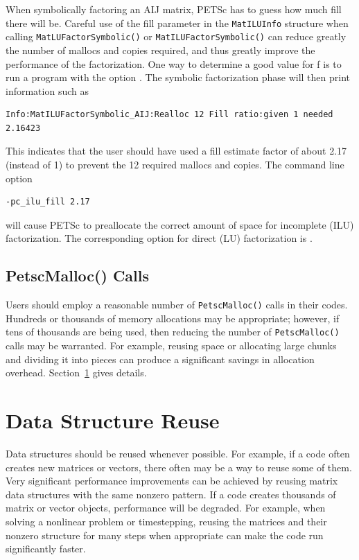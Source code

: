 {{When symbolically factoring an AIJ matrix, PETSc has to guess
how much fill there will be.  Careful use of the fill parameter in the
\lstinline{MatILUInfo} structure
when calling \lstinline{MatLUFactorSymbolic()} or \lstinline{MatILUFactorSymbolic()}
can reduce greatly the number of mallocs and copies required, and thus
greatly improve the performance of the factorization.  One way to
determine a good value for f is to run a program with the option .
The symbolic factorization phase will then print information such as
\begin{lstlisting}
Info:MatILUFactorSymbolic_AIJ:Realloc 12 Fill ratio:given 1 needed 2.16423
\end{lstlisting}
This indicates that the user should have used a fill estimate factor of
about 2.17 (instead of 1) to prevent the 12 required mallocs and copies.
The command line option   
\begin{lstlisting}
-pc_ilu_fill 2.17
\end{lstlisting}
will cause PETSc to preallocate the correct amount of space for incomplete
(ILU) factorization.  The corresponding option for direct (LU) factorization
is .

\subsection{PetscMalloc() Calls}
Users should employ a reasonable number of \lstinline{PetscMalloc()} calls in their codes.
Hundreds or thousands of memory allocations may be appropriate; however, if tens of
thousands are being used, then reducing the number of \lstinline{PetscMalloc()} calls
may be warranted.  For example, reusing space or allocating large chunks
and dividing it into pieces can produce a significant savings in
allocation overhead.  Section~\ref{sec_dsreuse} gives details.

\section{Data Structure Reuse}
\label{sec_dsreuse}

Data structures should be reused whenever possible.  For example, if a code often
creates new matrices or vectors, there often may be a way to reuse some
of them.  Very significant performance improvements can be achieved by
reusing matrix data structures with the same nonzero pattern.  If a code
creates thousands of matrix or vector objects, performance will be
degraded.  For example, when solving a nonlinear problem or timestepping,
reusing the matrices and their nonzero structure for many steps when
 appropriate can make the code run significantly faster.

}}
